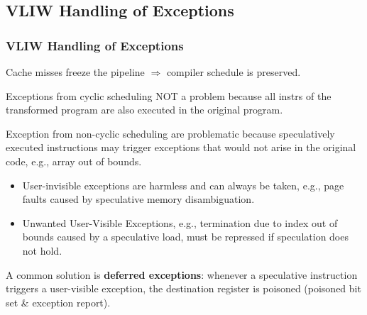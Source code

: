 \documentclass{beamer}
\newcommand{\emp}[1]{\textcolor{DikuRed}{ #1}}
\begin{document}
\subsection{VLIW Handling of Exceptions}

\begin{frame}[fragile,t]
    \frametitle{VLIW Handling of Exceptions}

Cache misses freeze the pipeline $\Rightarrow$ compiler schedule is preserved.
\bigskip

Exceptions from cyclic scheduling NOT a problem because all instrs of the transformed
program are also executed in the original program.
\bigskip

Exception from \emp{non-cyclic scheduling are problematic} because speculatively
executed instructions may trigger exceptions that would not arise in the original code,
e.g., array out of bounds.
  
\begin{scriptsize}
\begin{itemize}
    \item User-invisible exceptions are harmless and can always be taken, 
            e.g., page faults caused by speculative memory disambiguation.\smallskip
    \item Unwanted User-Visible Exceptions, e.g., termination due to index out of 
            bounds caused by a speculative load, 
            must be repressed if speculation does not hold.
\end  {itemize}
\end{scriptsize}

\bigskip

A common solution is {\bf deferred exceptions}: whenever a speculative 
instruction triggers a user-visible exception, the destination register
is poisoned (poisoned bit set \& exception report).  

\end{frame}
\end{document}
